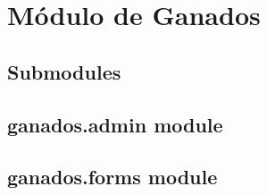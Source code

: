 \documentclass[letterpaper,10pt,spanish]{sphinxmanual}
\begin{document}
\section{Módulo de Ganados}
\label{ganados::doc}\label{ganados:ganados-package}

\subsection{Submodules}
\label{ganados:submodules}

\subsection{ganados.admin module}
\label{ganados:ganados-admin-module}\label{ganados:module-ganados.admin}

\subsection{ganados.forms module}
\label{ganados:ganados-forms-module}\label{ganados:module-ganados.forms}
\end{document}
